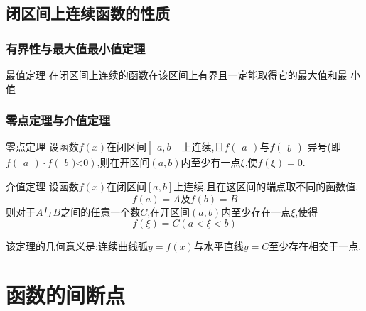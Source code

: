 \documentclass[12pt, a4paper, oneside, UTF8]{ctexbook}
\begin{document}
\subsection{闭区间上连续函数的性质}

\subsubsection{有界性与最大值最小值定理}
\begin{defn}{最值定理}{}
    在闭区间上连续的函数在该区间上有界且一定能取得它的最大值和最 小值
\end{defn}
\subsubsection{零点定理与介值定理}
\begin{defn}{零点定理}{}
    设函数$f(x)$在闭区间$\left[\begin{array}{c}a,b\end{array}\right]$上连续,且$f(\begin{array}{c}a\end{array})$与$f(\begin{array}{c}b\end{array})$ 异号(即$f(\begin{array}{c}a\end{array})\cdot f(\textit{ b )<}0)$,则在开区间$(a,b)$内至少有一点$\xi$,使$f(\xi)=0$.
\end{defn}
\begin{defn}{介值定理}{}
    设函数$f(x)$在闭区间$[a,b]$上连续,且在这区间的端点取不同的函数值,
    $$
        f(a)=A \text{及} f(b)=B
    $$
    则对于$A$与$B$之间的任意一个数$C$,在开区间$(a,b)$内至少存在一点$\xi$,使得
    $$
        f(\xi) =C (a< \xi <b)
    $$
\end{defn}
该定理的几何意义是:连续曲线弧$y=f(x)$与水平直线$y=C$至少存在相交于一点.
\section{函数的间断点}
\end{document}
